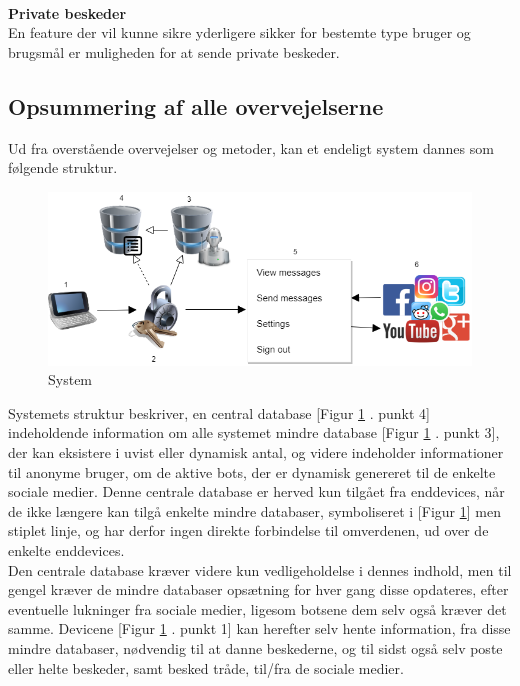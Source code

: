 \\
\textbf{Private beskeder}\\
En feature der vil kunne sikre yderligere sikker for bestemte type bruger og brugsmål er muligheden for at sende private beskeder. 











\subsection{Opsummering af alle overvejelserne}
Ud fra overstående overvejelser og metoder, kan et endeligt system dannes som følgende struktur.

\begin{figure}[H]
    \centering
    \includegraphics[width=0.70\linewidth]{Projectdoc/Assets/Illustrationer/System_struckure.png}
    \caption{System}
    \label{fig:sysdiagram}
\end{figure}

Systemets struktur beskriver, en central database [Figur \ref{fig:sysdiagram} . punkt 4] indeholdende information om alle systemet mindre database [Figur \ref{fig:sysdiagram} . punkt 3], der kan eksistere i uvist eller dynamisk antal, og videre indeholder informationer til anonyme bruger, om de aktive bots, der er dynamisk genereret til de enkelte sociale medier.
Denne centrale database er herved kun tilgået fra enddevices, når de ikke længere kan tilgå enkelte mindre databaser, symboliseret i [Figur \ref{fig:sysdiagram}] men stiplet linje, og har derfor ingen direkte forbindelse til omverdenen, ud over de enkelte enddevices. \\
Den centrale database kræver videre kun vedligeholdelse i dennes indhold, men til gengel kræver de mindre databaser opsætning for hver gang disse opdateres, efter eventuelle lukninger fra sociale medier, ligesom botsene dem selv også kræver det samme.
Devicene [Figur \ref{fig:sysdiagram} . punkt 1] kan herefter selv hente information, fra disse mindre databaser, nødvendig til at danne beskederne, og til sidst også selv poste eller helte beskeder, samt besked tråde, til/fra de sociale medier.

